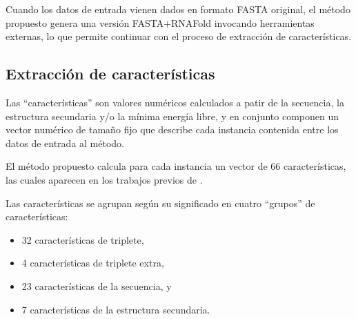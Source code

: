 \documentclass[12pt,bibliography=oldstyle,DIV=12,parskip=half-]{scrreprt}
\begin{document}
%
Cuando los datos de entrada vienen dados en formato FASTA original, el
método propuesto genera una versión FASTA+RNAFold invocando
herramientas externas, lo que permite continuar con el proceso de
extracción de características.
%
%
\subsection{Extracción de características}
%
Las ``características'' son valores numéricos calculados a patir de la
secuencia, la estructura secundaria y/o la mínima energía libre, y en
conjunto componen un vector numérico de tamaño fijo que describe cada
instancia contenida entre los datos de entrada al método.

El método propuesto calcula para cada instancia un vector de 66
características, las cuales aparecen en los trabajos previos de
\cite{xue, ng, batuwita}.

Las características se agrupan según su significado en cuatro
``grupos'' de características:
%
\begin{itemize}
\item 32 características de triplete,
\item 4 características de triplete extra,
\item 23 características de la secuencia, y
\item 7 características de la estructura secundaria.
\end{itemize}
%
%
%
\end{document}

